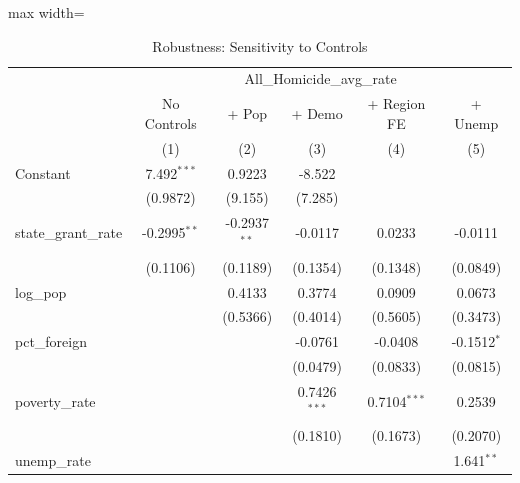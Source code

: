 \begin{table}[htbp]
   \caption{\label{tab:robustness} Robustness: Sensitivity to Controls}
   \bigskip
   \centering
   \begin{adjustbox}{max width=\textwidth}
   \begin{tabular}{lccccc}
      \toprule
       & \multicolumn{5}{c}{All\_Homicide\_avg\_rate}\\
                                               & No Controls    & + Pop          & + Demo         & + Region FE    & + Unemp \\   
                                               & (1)            & (2)            & (3)            & (4)            & (5)\\  
      \midrule 
      Constant                                 & 7.492$^{***}$  & 0.9223         & -8.522         &                &   \\   
                                               & (0.9872)       & (9.155)        & (7.285)        &                &   \\   
      state\_grant\_rate                       & -0.2995$^{**}$ & -0.2937$^{**}$ & -0.0117        & 0.0233         & -0.0111\\   
                                               & (0.1106)       & (0.1189)       & (0.1354)       & (0.1348)       & (0.0849)\\   
      log\_pop                                 &                & 0.4133         & 0.3774         & 0.0909         & 0.0673\\   
                                               &                & (0.5366)       & (0.4014)       & (0.5605)       & (0.3473)\\   
      pct\_foreign                             &                &                & -0.0761        & -0.0408        & -0.1512$^{*}$\\   
                                               &                &                & (0.0479)       & (0.0833)       & (0.0815)\\   
      poverty\_rate                            &                &                & 0.7426$^{***}$ & 0.7104$^{***}$ & 0.2539\\   
                                               &                &                & (0.1810)       & (0.1673)       & (0.2070)\\   
      unemp\_rate                              &                &                &                &                & 1.641$^{**}$\\   

\end{tabular}
\end{adjustbox}
\end{table}

